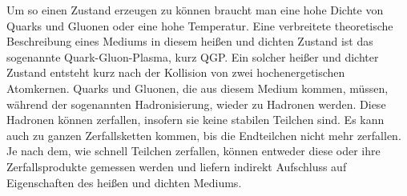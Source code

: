 Um so einen Zustand erzeugen zu k\"onnen braucht man eine hohe Dichte von Quarks und Gluonen oder eine hohe Temperatur.
Eine verbreitete theoretische Beschreibung eines Mediums in diesem hei{\ss}en und dichten Zustand ist das sogenannte Quark-Gluon-Plasma, kurz QGP.
\newline
Ein solcher hei{\ss}er und dichter Zustand entsteht kurz nach der Kollision von zwei hochenergetischen Atomkernen.
Quarks und Gluonen, die aus diesem Medium kommen, m\"ussen, w\"ahrend der sogenannten Hadronisierung, wieder zu Hadronen werden.
Diese Hadronen k\"onnen zerfallen, insofern sie keine stabilen Teilchen sind.
Es kann auch zu ganzen Zerfallsketten kommen, bis die Endteilchen nicht mehr zerfallen.
Je nach dem, wie schnell Teilchen zerfallen, k\"onnen entweder diese oder ihre Zerfallsprodukte gemessen werden und liefern indirekt Aufschluss auf Eigenschaften des hei{\ss}en und dichten Mediums.
